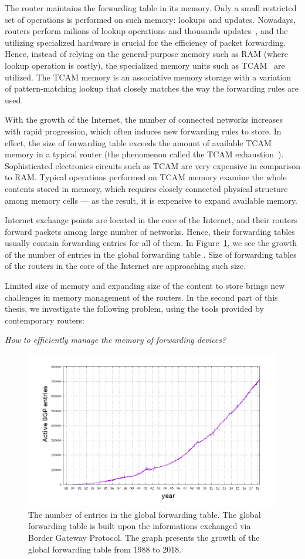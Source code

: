 The router maintains the forwarding table in its memory.
Only a small restricted set of operations is performed on such memory: lookups and updates.
Nowadays, routers perform milions of lookup operations and thousands updates~\cite{bgp-updates}, and the utilizing specialized hardware is crucial for the efficiency of packet forwarding.
Hence, instead of relying on the general-purpose memory such as RAM (where lookup operation is costly), the specialized memory units such as TCAM~\cite{tcam-memory} are utilized.
The TCAM memory is an associative memory storage with a variation of pattern-matching lookup that closely matches the way the forwarding rules are used.

With the growth of the Internet, the number of connected networks increases with rapid progression, which often induces new forwarding rules to store.
In effect, the size of forwarding table exceeds the amount of available TCAM memory in a typical router (the phenomenon called the TCAM exhaustion~\cite{tcam-exhaust}).
Sophisticated electronics circuits such as TCAM are very expensive in comparison to RAM.
Typical operations performed on TCAM memory examine the whole contents stored in memory, which requires closely connected physical structure among memory cells --- as the result, it is expensive to expand available memory.

Internet exchange points are located in the core of the Internet, and their routers forward packets among large number of networks.
Hence, their forwarding tables usually contain forwarding entries for all of them.
In Figure~\ref{fig:bgp-entries}, we see the growth of the number of entries in the global forwarding table \cite{url-bgp-entries}.
Size of forwarding tables of the routers in the core of the Internet are approaching such size.

Limited size of memory and expanding size of the content to store brings new challenges in memory management of the routers.
In the second part of this thesis, we investigate the following problem, using the tools provided by contemporary routers:
\begin{center}
  \emph{How to efficiently manage the memory of forwarding devices?}
\end{center}


\begin{figure}[t]
\centering
\includegraphics[width=0.59\columnwidth]{figs/bgp-entries.png}
\caption{The number of entries in the global forwarding table. The global forwarding table is built upon the informations exchanged via Border Gateway Protocol. The graph presents the growth of the global forwarding table from 1988 to 2018.}\label{fig:bgp-entries}
\vspace{-1em}
\end{figure}

